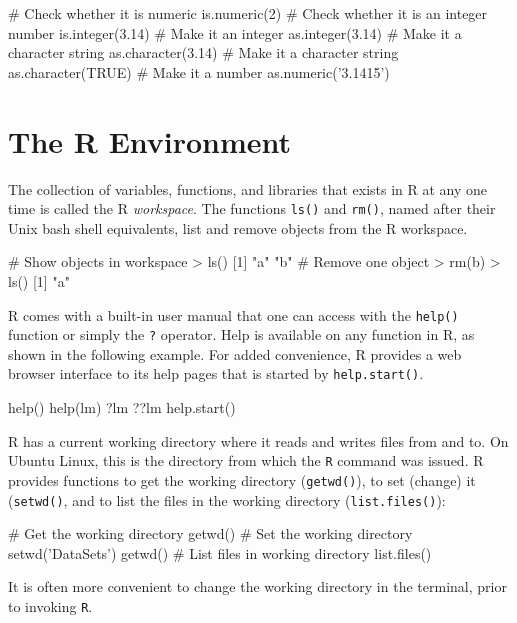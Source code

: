 \begin{Rcode}
# Check whether it is numeric
is.numeric(2)
# Check whether it is an integer number
is.integer(3.14)
# Make it an integer
as.integer(3.14)
# Make it a character string
as.character(3.14)
# Make it a character string
as.character(TRUE)
# Make it a number
as.numeric('3.1415')
\end{Rcode}

\section{The R Environment}

The collection of variables, functions, and libraries that exists in R at any one time is called the R \emph{workspace}. The functions \texttt{ls()} and \texttt{rm()}, named after their Unix bash shell equivalents, list and remove objects from the R workspace.

\begin{Rcode}
# Show objects in workspace
> ls()
[1] "a"          "b"
# Remove one object
> rm(b)
> ls()
[1] "a"
\end{Rcode}

R comes with a built-in user manual that one can access with the \texttt{help()} function or simply the \texttt{?} operator. Help is available on any function in R, as shown in the following example. For added convenience, R provides a web browser interface to its help pages that is started by \texttt{help.start()}.

\begin{Rcode}
help()
help(lm)
?lm
??lm
help.start()
\end{Rcode}

R has a current working directory where it reads and writes files from and to. On Ubuntu Linux, this is the directory from which the \texttt{R} command was issued. R provides functions to get the working directory (\texttt{getwd()}), to set (change) it (\texttt{setwd()}, and to list the files in the working directory (\texttt{list.files()}):

\begin{Rcode}
# Get the working directory
getwd()
# Set the working directory
setwd('DataSets')
getwd()
# List files in working directory
list.files()
\end{Rcode}

\begin{infobox}It is often more convenient to change the working directory in the terminal, prior to invoking \texttt{R}.
\end{infobox}

